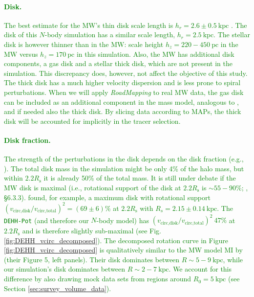 \documentclass[iop,revtex4,numberedappendix,appendixfloats]{emulateapj}
\newcommand{\RM}{{\sl RoadMapping}}
\newcommand{\NEW}[1]{\textcolor{Green}{#1}}
\begin{document}
\NEW{\paragraph{Disk.} The best estimate for the MW's thin disk scale length is $h_r = 2.6 \pm 0.5~\text{kpc}$ \citep{2016ARA&A..54..529B}. The disk of this $N$-body simulation has a similar scale length, $h_r = 2.5~\text{kpc}$. The stellar disk is however thinner than in the MW: scale height $h_z=220-450~\text{pc}$ in the MW \citep{2016ARA&A..54..529B} versus $h_z=170~\text{pc}$ in this simulation. Also, the MW has additional disk components, a gas disk and a stellar thick disk, which are not present in the simulation. This discrepancy does, however, not affect the objective of this study. The thick disk has a much higher velocity dispersion and is less prone to spiral perturbations. When we will apply \RM{} to real MW data, the gas disk can be included as an additional component in the mass model, analogous to \citet{2013ApJ...779..115B}, and if needed also the thick disk. By slicing data according to MAPs, the thick disk will be accounted for implicitly in the tracer selection.}

\NEW{\paragraph{Disk fraction.} The strength of the perturbations in the disk depends on the disk fraction (e.g., \citealt{2015ApJ...808L...8D}). The total disk mass in the simulation might be only 4\% of the halo mass, but within $2.2R_\text{s}$ it is already 50\% of the total mass. It is still under debate if the MW disk is maximal (i.e., rotational support of the disk at $2.2R_\text{s}$ is $\sim55-90\%$; \citealt{1997ApJ...483..103S, 2008gady.book.....B}, \S 6.3.3). \citet{2013ApJ...779..115B} found, for example, a maximum disk with rotational support $\left( v_\text{circ,disk}/v_\text{circ,total}\right)^2=(69\pm6)\%$ at $2.2R_\text{s}$ with $R_s=2.15\pm0.14~\text{kpc}$. The \texttt{DEHH-Pot} (and therefore our $N$-body model) has  $\left( v_\text{circ,disk}/v_\text{circ,total}\right)^2~47\%$ at $2.2R_\text{s}$ and is therefore slightly sub-maximal (see Fig. \ref{fig:DEHH_vcirc_decomposed}). The decomposed rotation curve in Figure \ref{fig:DEHH_vcirc_decomposed} is qualitatively similar to the MW model MI by \citep{2016A&A...593A.108B} (their Figure 5, left panels). Their disk dominates between $R\sim5-9~\text{kpc}$, while our simulation's disk dominates between $R\sim2-7~\text{kpc}$. We account for this difference by also drawing mock data sets from regions around $R_0=5~\text{kpc}$ (see Section \ref{sec:survey_volume_data}).}
\end{document}
